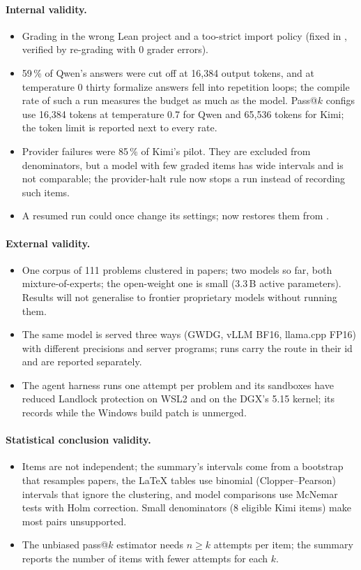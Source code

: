 \documentclass[11pt,a4paper]{article}
\begin{document}
\paragraph{Internal validity.}
\begin{itemize}
\item Grading in the wrong Lean project and a too-strict import policy (fixed in , verified by re-grading with 0 grader errors).
\item 59\,\% of Qwen's answers were cut off at 16,384 output tokens, and at temperature 0 thirty formalize answers fell into repetition loops; the compile rate of such a run measures the budget as much as the model. Pass@$k$ configs use 16,384 tokens at temperature 0.7 for Qwen and 65,536 tokens for Kimi; the token limit is reported next to every rate.
\item Provider failures were 85\,\% of Kimi's pilot. They are excluded from denominators, but a model with few graded items has wide intervals and is not comparable; the provider-halt rule now stops a run instead of recording such items.
\item A resumed run could once change its settings;  now restores them from .
\end{itemize}

\paragraph{External validity.}
\begin{itemize}
\item One corpus of 111 problems clustered in papers; two models so far, both mixture-of-experts; the open-weight one is small (3.3\,B active parameters). Results will not generalise to frontier proprietary models without running them.
\item The same model is served three ways (GWDG, vLLM BF16, llama.cpp FP16) with different precisions and server programs; runs carry the route in their id and are reported separately.
\item The agent harness runs one attempt per problem and its sandboxes have reduced Landlock protection on WSL2 and on the DGX's 5.15 kernel; its  records  while the Windows build patch is unmerged.
\end{itemize}

\paragraph{Statistical conclusion validity.}
\begin{itemize}
\item Items are not independent; the summary's intervals come from a bootstrap that resamples papers, the LaTeX tables use binomial (Clopper--Pearson) intervals that ignore the clustering, and model comparisons use McNemar tests with Holm correction. Small denominators (8 eligible Kimi items) make most pairs unsupported.
\item The unbiased pass@$k$ estimator needs $n \geq k$ attempts per item; the summary reports the number of items with fewer attempts for each $k$.
\end{itemize}
\end{document}
